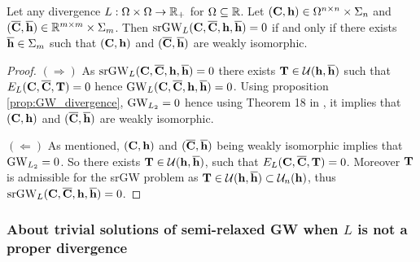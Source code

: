 \begin{lemma}\label{lemma:srgw_divergence}
	Let any divergence $L: \Omega \times \Omega \rightarrow \mathbb{R}_+$ for $\Omega \subseteq \mathbb{R}$. Let $({\mathbf{C}}, {\mathbf{h}}) \in \Omega^{n \times n} \times \Sigma_n$  and $(\overline{{\mathbf{C}}}, \overline{{\mathbf{h}}}) \in \mathbb{R}^{m \times m} \times \Sigma_m$. Then $\operatorname{srGW}_L({\mathbf{C}}, \overline{{\mathbf{C}}}, {\mathbf{h}}, \overline{{\mathbf{h}}}) = 0$ if and only if there exists $\overline{{\mathbf{h}}} \in \Sigma_m$ such that $({\mathbf{C}}, {\mathbf{h}})$ and $(\overline{{\mathbf{C}}}, \overline{{\mathbf{h}}})$ are weakly isomorphic.
\end{lemma}
\begin{proof}
	$(\Rightarrow)$ As $\operatorname{srGW}_L({\mathbf{C}}, \overline{{\mathbf{C}}}, {\mathbf{h}}, \overline{{\mathbf{h}}}) = 0$ there exists ${\mathbf{T}} \in \mathcal{U}({\mathbf{h}}, \overline{{\mathbf{h}}})$ such that $E_L({\mathbf{C}}, \overline{{\mathbf{C}}}, {\mathbf{T}}) = 0$ hence $\operatorname{GW}_L({\mathbf{C}}, \overline{{\mathbf{C}}}, {\mathbf{h}}, \overline{{\mathbf{h}}}) = 0$. Using proposition \ref{prop:GW_divergence}, $\operatorname{GW}_{L_2}=0$ hence using Theorem 18 in \citep{chowdhury2019gromov}, it implies that $({\mathbf{C}}, {\mathbf{h}})$ and $(\overline{{\mathbf{C}}}, \overline{{\mathbf{h}}})$ are weakly isomorphic.
	
	$(\Leftarrow)$ As mentioned, $({\mathbf{C}}, {\mathbf{h}})$ and $(\overline{{\mathbf{C}}}, \overline{{\mathbf{h}}})$ being weakly isomorphic implies that $\operatorname{GW}_{L_2}=0$. So there exists ${\mathbf{T}} \in \mathcal{U}({\mathbf{h}}, \overline{{\mathbf{h}}})$, such that $E_L({\mathbf{C}}, \overline{{\mathbf{C}}}, {\mathbf{T}}) = 0$. Moreover ${\mathbf{T}}$ is admissible for the srGW problem as ${\mathbf{T}} \in \mathcal{U}({\mathbf{h}}, \overline{{\mathbf{h}}}) \subset \mathcal{U}_n({\mathbf{h}})$, thus $\operatorname{srGW}_L({\mathbf{C}}, \overline{{\mathbf{C}}}, {\mathbf{h}}, \overline{{\mathbf{h}}}) = 0$.
\end{proof}

\subsubsection{About trivial solutions of semi-relaxed GW when $L$ is not a proper divergence}

